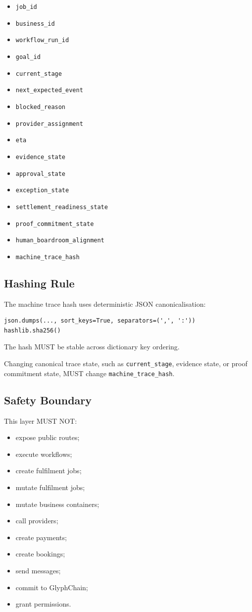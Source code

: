 \begin{itemize}
  \item \texttt{job\_id}
  \item \texttt{business\_id}
  \item \texttt{workflow\_run\_id}
  \item \texttt{goal\_id}
  \item \texttt{current\_stage}
  \item \texttt{next\_expected\_event}
  \item \texttt{blocked\_reason}
  \item \texttt{provider\_assignment}
  \item \texttt{eta}
  \item \texttt{evidence\_state}
  \item \texttt{approval\_state}
  \item \texttt{exception\_state}
  \item \texttt{settlement\_readiness\_state}
  \item \texttt{proof\_commitment\_state}
  \item \texttt{human\_boardroom\_alignment}
  \item \texttt{machine\_trace\_hash}
\end{itemize}

\subsection{Hashing Rule}

The machine trace hash uses deterministic JSON canonicalisation:

\begin{verbatim}
json.dumps(..., sort_keys=True, separators=(',', ':'))
hashlib.sha256()
\end{verbatim}

The hash MUST be stable across dictionary key ordering.

Changing canonical trace state, such as \texttt{current\_stage}, evidence state, or proof commitment state, MUST change \texttt{machine\_trace\_hash}.

\subsection{Safety Boundary}

This layer MUST NOT:

\begin{itemize}
  \item expose public routes;
  \item execute workflows;
  \item create fulfilment jobs;
  \item mutate fulfilment jobs;
  \item mutate business containers;
  \item call providers;
  \item create payments;
  \item create bookings;
  \item send messages;
  \item commit to GlyphChain;
  \item grant permissions.
\end{itemize}

